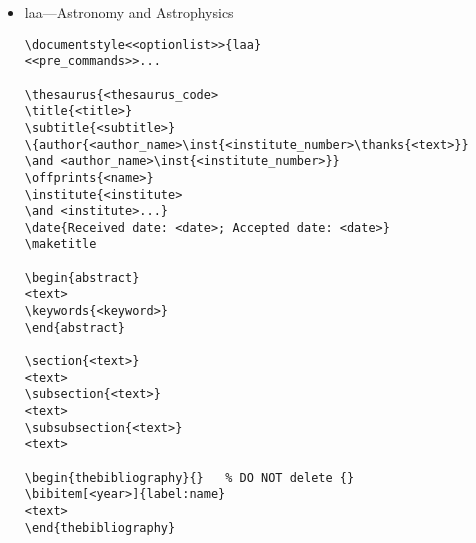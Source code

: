 \begin{itemize}
\begin{small}
\begin{verbatim}
\begin{titlepage}
\maketitle
\end{titlepage}

\cleardoublepage
%
% Page 1 reserved for revision history page
%
\setcounter{page}{2}
\tableofcontents
\newpage

% Since all bookform documents don't necessarily follow the same
% section structure, the author must layout the document as desired.


\end{verbatim}
\end{small}

\item laa---Astronomy and Astrophysics

\begin{small}
\begin{verbatim}
\documentstyle<<optionlist>>{laa}
<<pre_commands>>...

\thesaurus{<thesaurus_code>
\title{<title>}
\subtitle{<subtitle>}
\{author{<author_name>\inst{<institute_number>\thanks{<text>}}
\and <author_name>\inst{<institute_number>}}
\offprints{<name>}
\institute{<institute>
\and <institute>...}
\date{Received date: <date>; Accepted date: <date>}
\maketitle

\begin{abstract}
<text>
\keywords{<keyword>}
\end{abstract}

\section{<text>}
<text>
\subsection{<text>}
<text>
\subsubsection{<text>}
<text>

\begin{thebibliography}{}	% DO NOT delete {}
\bibitem[<year>]{label:name}
<text>
\end{thebibliography}



\end{verbatim}
\end{small}
\end{itemize}
